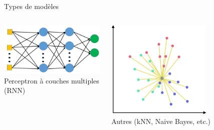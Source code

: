 \documentclass[compress]{beamer}
\begin{document}
\begin{frame}{Types de modèles}
\begin{adjustwidth}{-2.5em}{-2.5em}
\begin{columns}
\begin{column}{0.33\textwidth}
     \includegraphics[width=\textwidth]{resources/MLP}\\
     {\footnotesize Perceptron à couches multiples (RNN)}
   \end{column}
   \begin{column}{0.33\textwidth}
     \centering
     \includegraphics[width=0.65\textwidth]{resources/kNN}\\
     {\footnotesize Autres (kNN, Naive Bayes, etc.)}
   \end{column}
  \end{columns}
  \end{adjustwidth}
\end{frame}
\end{document}
